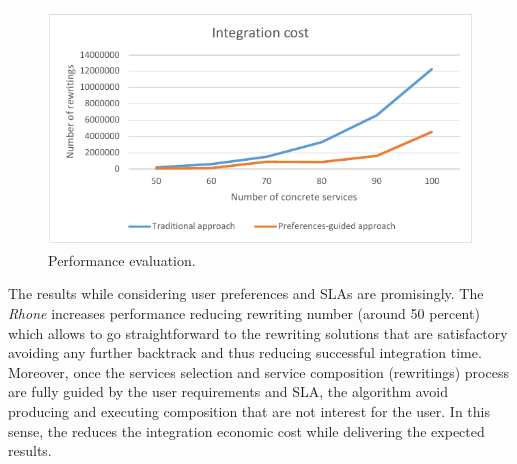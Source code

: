 
\begin{figure}[!h]
\centering
\includegraphics[scale=0.8]{fig2.pdf}
\caption{Performance evaluation.}\label{fig02}
\end{figure} 

The results while considering user preferences and SLAs are promisingly.  
The \textit{Rhone} increases performance reducing rewriting number (around 50 percent) which allows to go straightforward to the rewriting solutions that are satisfactory avoiding any further backtrack and thus reducing successful integration time. Moreover, once the services selection and service composition (rewritings) process are fully guided by the user requirements and SLA, the algorithm avoid producing and executing composition that are not interest for the user. In this sense, the reduces the integration economic cost while delivering the expected results.
